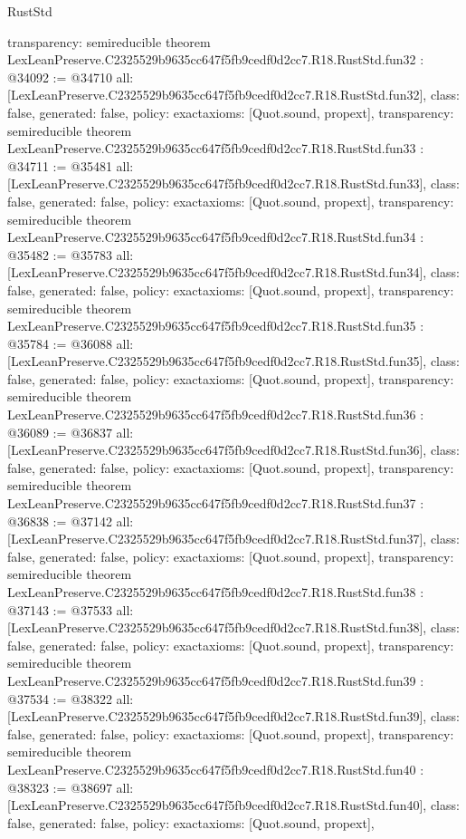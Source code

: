 \begin{lexlean}{RustStd}
\begin{coremodule}
{  transparency: semireducible
}
theorem LexLeanPreserve.C2325529b9635cc647f5fb9cedf0d2cc7.R18.RustStd.fun32 : @34092 := @34710 {
  all: [LexLeanPreserve.C2325529b9635cc647f5fb9cedf0d2cc7.R18.RustStd.fun32],
  class: false,
  generated: false,
  policy: exact{axioms: [Quot.sound, propext]},
  transparency: semireducible
}
theorem LexLeanPreserve.C2325529b9635cc647f5fb9cedf0d2cc7.R18.RustStd.fun33 : @34711 := @35481 {
  all: [LexLeanPreserve.C2325529b9635cc647f5fb9cedf0d2cc7.R18.RustStd.fun33],
  class: false,
  generated: false,
  policy: exact{axioms: [Quot.sound, propext]},
  transparency: semireducible
}
theorem LexLeanPreserve.C2325529b9635cc647f5fb9cedf0d2cc7.R18.RustStd.fun34 : @35482 := @35783 {
  all: [LexLeanPreserve.C2325529b9635cc647f5fb9cedf0d2cc7.R18.RustStd.fun34],
  class: false,
  generated: false,
  policy: exact{axioms: [Quot.sound, propext]},
  transparency: semireducible
}
theorem LexLeanPreserve.C2325529b9635cc647f5fb9cedf0d2cc7.R18.RustStd.fun35 : @35784 := @36088 {
  all: [LexLeanPreserve.C2325529b9635cc647f5fb9cedf0d2cc7.R18.RustStd.fun35],
  class: false,
  generated: false,
  policy: exact{axioms: [Quot.sound, propext]},
  transparency: semireducible
}
theorem LexLeanPreserve.C2325529b9635cc647f5fb9cedf0d2cc7.R18.RustStd.fun36 : @36089 := @36837 {
  all: [LexLeanPreserve.C2325529b9635cc647f5fb9cedf0d2cc7.R18.RustStd.fun36],
  class: false,
  generated: false,
  policy: exact{axioms: [Quot.sound, propext]},
  transparency: semireducible
}
theorem LexLeanPreserve.C2325529b9635cc647f5fb9cedf0d2cc7.R18.RustStd.fun37 : @36838 := @37142 {
  all: [LexLeanPreserve.C2325529b9635cc647f5fb9cedf0d2cc7.R18.RustStd.fun37],
  class: false,
  generated: false,
  policy: exact{axioms: [Quot.sound, propext]},
  transparency: semireducible
}
theorem LexLeanPreserve.C2325529b9635cc647f5fb9cedf0d2cc7.R18.RustStd.fun38 : @37143 := @37533 {
  all: [LexLeanPreserve.C2325529b9635cc647f5fb9cedf0d2cc7.R18.RustStd.fun38],
  class: false,
  generated: false,
  policy: exact{axioms: [Quot.sound, propext]},
  transparency: semireducible
}
theorem LexLeanPreserve.C2325529b9635cc647f5fb9cedf0d2cc7.R18.RustStd.fun39 : @37534 := @38322 {
  all: [LexLeanPreserve.C2325529b9635cc647f5fb9cedf0d2cc7.R18.RustStd.fun39],
  class: false,
  generated: false,
  policy: exact{axioms: [Quot.sound, propext]},
  transparency: semireducible
}
theorem LexLeanPreserve.C2325529b9635cc647f5fb9cedf0d2cc7.R18.RustStd.fun40 : @38323 := @38697 {
  all: [LexLeanPreserve.C2325529b9635cc647f5fb9cedf0d2cc7.R18.RustStd.fun40],
  class: false,
  generated: false,
  policy: exact{axioms: [Quot.sound, propext]},
}
\end{coremodule}
\end{lexlean}
